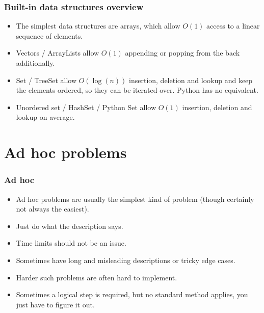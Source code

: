 \documentclass{beamer}
\begin{document}
\begin{frame}[plain]
    \frametitle{Built-in data structures overview}
    \begin{itemize}
        \item The simplest data structures are arrays, which allow $O(1)$ access to a linear sequence of elements.
        \item Vectors / ArrayLists allow $O(1)$ appending or popping from the back additionally.
        \item Set / TreeSet allow $O(\log(n))$ insertion, deletion and lookup and keep the elements ordered, so they can be iterated over. Python has no equivalent.
        \item Unordered set / HashSet / Python Set allow $O(1)$ insertion, deletion and lookup on average.
    \end{itemize}
\end{frame}


\section*{Ad hoc problems}

\begin{frame}[plain]
    \frametitle{Ad hoc}
    \begin{itemize}
        \item Ad hoc problems are usually the simplest kind of problem (though certainly not always the easiest).
        \item Just do what the description says.
        \item Time limits should not be an issue.
        \item Sometimes have long and misleading descriptions or tricky edge cases.
        \item Harder such problems are often hard to implement.
        \item Sometimes a logical step is required, but no standard method applies, you just have to figure it out.
    \end{itemize}
\end{frame}
\end{document}
